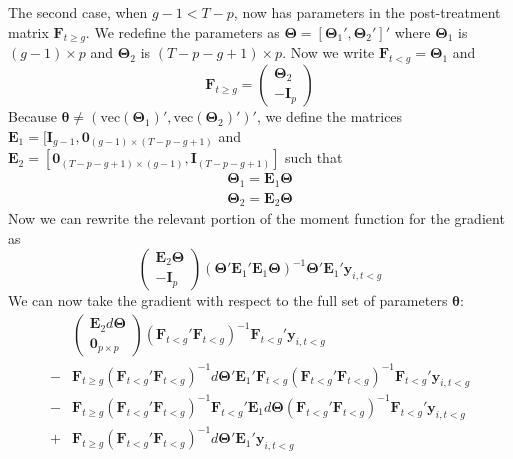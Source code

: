 The second case, when $g - 1 < T-p$, now has parameters in the post-treatment matrix $\bm F_{t \geq g}$. We redefine the parameters as $\bm \Theta = [ \bm \Theta_1', \bm \Theta_2']'$ where $\bm \Theta_1$ is $(g-1) \times p$ and $\bm \Theta_2$ is $(T-p - g + 1) \times p$. Now we write $\bm F_{t < g} = \bm \Theta_1$ and 
\begin{equation}
    \bm F_{t \geq g} = 
    \begin{pmatrix}
        \bm \Theta_2\\
        - \bm I_p
    \end{pmatrix}
\end{equation}
Because $\bm \theta \neq (\text{vec}(\bm \Theta_1)', \text{vec}(\bm \Theta_2)')'$, we define the matrices $\bm E_1 = [\bm I_{g-1}, \bm 0_{(g-1) \times (T-p - g+1)}$ and $\bm E_2 = [ \bm 0_{(T-p - g + 1) \times (g-1)}, \bm I_{(T-p -g + 1)}]$ such that 
\begin{gather}
    \bm \Theta_1 = \bm E_1 \bm \Theta\\
    \bm \Theta_2 = \bm E_2 \bm \Theta
\end{gather}
Now we can rewrite the relevant portion of the moment function for the gradient as
\begin{equation}
    \begin{pmatrix}
        \bm E_2 \bm \Theta\\
        -\bm I_p
    \end{pmatrix}
    \left( \bm \Theta' \bm E_1' \bm E_1 \bm \Theta \right)^{-1} \bm \Theta' \bm E_1' \bm y_{i, t < g}
\end{equation} 
We can now take the gradient with respect to the full set of parameters $\bm \theta$:
\begin{align}
    & 
    \begin{pmatrix}
        \bm E_2 d \bm \Theta\\
        \bm 0_{p \times p}
    \end{pmatrix}
    \left( \bm F_{t < g}' \bm F_{t < g} \right)^{-1} \bm F_{t < g}' \bm y_{i, t < g}\label{case2_diff_eq1}\\
    - & 
    \bm F_{t \geq g} \left( \bm F_{t < g}' \bm F_{t < g} \right)^{-1} d \bm \Theta' \bm E_1' \bm F_{t < g} \left( \bm F_{t < g}' \bm F_{t < g} \right)^{-1} \bm F_{t < g}' \bm y_{i, t < g}\\
    - & \bm F_{t \geq g} \left( \bm F_{t < g}' \bm F_{t < g} \right)^{-1} \bm F_{t < g}' \bm E_1 d \bm \Theta \left( \bm F_{t < g}' \bm F_{t < g} \right)^{-1} \bm F_{t < g}' \bm y_{i, t < g}\\
    + & 
    \bm F_{t \geq g} \left( \bm F_{t < g}' \bm F_{t < g} \right)^{-1} d \bm \Theta' \bm E_1' \bm y_{i, t < g}
\end{align}
